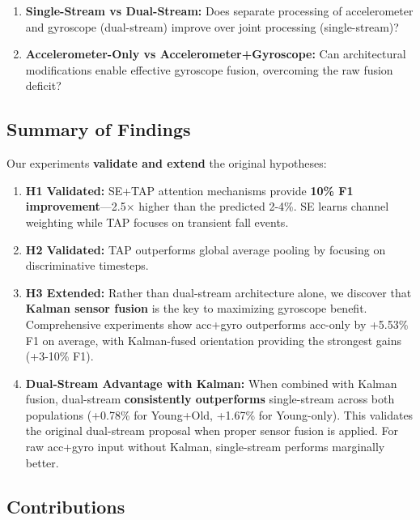 \documentclass{article}
\begin{document}
\begin{enumerate}[label=\textbf{RQ\arabic*:}]
    \item \textbf{Single-Stream vs Dual-Stream:} Does separate processing of accelerometer and gyroscope (dual-stream) improve over joint processing (single-stream)?
    \item \textbf{Accelerometer-Only vs Accelerometer+Gyroscope:} Can architectural modifications enable effective gyroscope fusion, overcoming the raw fusion deficit?
\end{enumerate}

\subsection{Summary of Findings}

Our experiments \textbf{validate and extend} the original hypotheses:

\begin{enumerate}
    \item \textbf{H1 Validated:} SE+TAP attention mechanisms provide \textbf{10\% F1 improvement}---2.5$\times$ higher than the predicted 2-4\%. SE learns channel weighting while TAP focuses on transient fall events.

    \item \textbf{H2 Validated:} TAP outperforms global average pooling by focusing on discriminative timesteps.

    \item \textbf{H3 Extended:} Rather than dual-stream architecture alone, we discover that \textbf{Kalman sensor fusion} is the key to maximizing gyroscope benefit. Comprehensive experiments show acc+gyro outperforms acc-only by +5.53\% F1 on average, with Kalman-fused orientation providing the strongest gains (+3-10\% F1).

    \item \textbf{Dual-Stream Advantage with Kalman:} When combined with Kalman fusion, dual-stream \textbf{consistently outperforms} single-stream across both populations (+0.78\% for Young+Old, +1.67\% for Young-only). This validates the original dual-stream proposal when proper sensor fusion is applied. For raw acc+gyro input without Kalman, single-stream performs marginally better.
\end{enumerate}

\subsection{Contributions}
\end{document}
